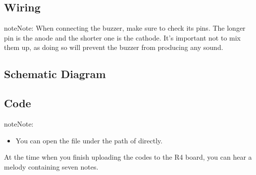 \documentclass[a4paper,11pt,english]{sphinxmanual}
\begin{document}
\subsection{Wiring}
\label{\detokenize{Basic_Project/Passive_Buzzer:wiring}}
\begin{sphinxadmonition}{note}{Note:}
\sphinxAtStartPar
When connecting the buzzer, make sure to check its pins. The longer pin is the anode and the shorter one is the cathode. It’s important not to mix them up, as doing so will prevent the buzzer from producing any sound.
\end{sphinxadmonition}



\subsection{Schematic Diagram}
\label{\detokenize{Basic_Project/Passive_Buzzer:schematic-diagram}}


\subsection{Code}
\label{\detokenize{Basic_Project/Passive_Buzzer:code}}
\begin{sphinxadmonition}{note}{Note:}\begin{itemize}
\item {} 
\sphinxAtStartPar
You can open the file  under the path of  directly.

\end{itemize}
\end{sphinxadmonition}

\sphinxAtStartPar
At the time when you finish uploading the codes to the R4 board, you can hear a melody containing seven notes.
\end{document}
